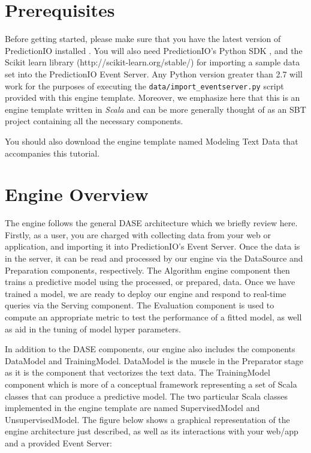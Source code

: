 \documentclass[a4paper,12pt]{article}
\renewcommand{\it}[1]{\textit{#1}}
\renewcommand{\tt}[1]{\texttt{#1}}
\newcommand{\3}{\left}
\newcommand{\4}{\right}
\renewcommand{\-}[1]{{}^{-#1}}
\begin{document}
\section*{Prerequisites}

Before getting started, please make sure that you have the latest version of PredictionIO installed 
. You will also need PredictionIO's Python SDK 
, and the Scikit learn library (http://scikit-learn.org/stable/) for importing a sample data set into the PredictionIO Event Server. Any Python version greater than 2.7 will work for the purposes of executing the \tt{data/import\_eventserver.py} script provided with this engine template. Moreover, we emphasize here that this is an engine template written in \it{Scala} and can be more generally thought of as an SBT project containing all the necessary components.

You should also download the engine template named Modeling Text Data 
 that accompanies this tutorial.

\section*{Engine Overview}

The engine follows the general DASE architecture which we briefly review here. Firstly, as a user, you are charged with collecting data from your web or application, and importing it into PredictionIO's Event Server. Once the data is in the server, it  can be read and processed by our engine via the DataSource and Preparation components, respectively. The Algorithm engine component then trains a predictive model using the processed, or prepared, data. Once we have trained a model, we are ready to deploy our engine and respond to real-time queries via the Serving component. The Evaluation component is used to compute an appropriate metric to test the performance of a fitted model, as well as aid in the tuning of model hyper parameters. 

In addition to the DASE components, our engine also includes the components DataModel and TrainingModel. DataModel is the muscle in the Preparator stage as it is the component that vectorizes the text data. The TrainingModel component which is more of a conceptual framework representing a set of Scala classes that can produce a predictive model. The two particular Scala classes implemented in the engine template are named SupervisedModel and UnsupervisedModel. The figure below shows a graphical representation of the engine architecture just described, as well as its interactions with your web/app and a provided Event Server:
\end{document}
